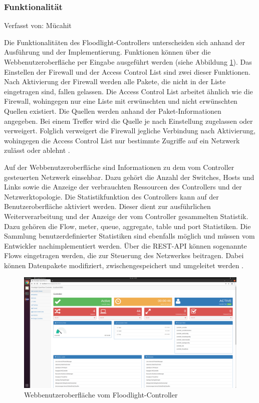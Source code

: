 \documentclass[fontsize=12pt,paper=a4,open=any,parskip=half,
  twoside=false,toc=listof,toc=bibliography,fleqn,leqno,
  captions=nooneline,captions=tableabove,british]{scrbook}
\begin{document}
\subsubsection{Funktionalität}
{\tiny Verfasst von: Mücahit\par}
Die Funktionalitäten des Floodlight-Controllers unterscheiden sich anhand der Ausführung und der Implementierung. Funktionen können über die Webbenutzeroberfläche per Eingabe ausgeführt werden (siehe Abbildung \ref{webui}). Das Einstellen der Firewall und der Access Control List sind zwei dieser Funktionen. Nach Aktivierung der Firewall werden alle Pakete, die nicht in der Liste eingetragen sind, fallen gelassen. Die Access Control List arbeitet ähnlich wie die Firewall, wohingegen nur eine Liste mit erwünschten und nicht erwünschten Quellen existiert. Die Quellen werden anhand der Paket-Informationen angegeben. Bei einem Treffer wird die Quelle je nach Einstellung zugelassen oder verweigert. Folglich verweigert die Firewall jegliche Verbindung nach Aktivierung, wohingegen die Access Control List nur bestimmte Zugriffe auf ein Netzwerk zulässt oder ablehnt \cite{firewall}. \par
Auf der Webbenutzeroberfläche sind Informationen zu dem vom Controller gesteuerten Netzwerk einsehbar. Dazu gehört die Anzahl der Switches, Hosts und Links sowie die Anzeige der verbrauchten Ressourcen des Controllers und der Netzwerktopologie. Die Statistikfunktion des Controllers kann auf der Benutzeroberfläche aktiviert werden. Dieser dient zur ausführlichen Weiterverarbeitung und der Anzeige der vom Controller gesammelten Statistik. Dazu gehören die Flow, meter, queue, aggregate, table und port Statistiken. Die Sammlung benutzerdefinierter Statistiken sind ebenfalls möglich und müssen vom Entwickler nachimplementiert werden. Über die REST-API können sogenannte Flows eingetragen werden, die zur Steuerung des Netzwerkes beitragen. Dabei können Datenpakete modifiziert, zwischengespeichert und umgeleitet werden \cite{statistik}.

\begin{figure}[H]
 \centering
 \includegraphics[width=1.0\textwidth]{Bilder/webui}
 \captionsetup{justification=centering}
 \caption{Webbenutzeroberfläche vom Floodlight-Controller}
 \label{webui}
\end{figure}
\end{document}
